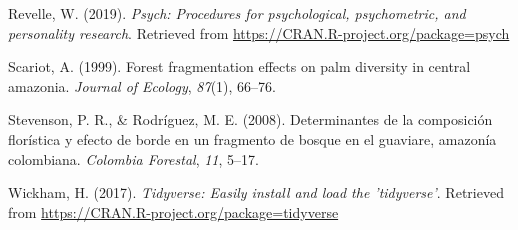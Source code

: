 \documentclass[11pt,]{article}
\begin{document}
\hypertarget{ref-psych}{}
Revelle, W. (2019). \emph{Psych: Procedures for psychological,
psychometric, and personality research}. Retrieved from
\url{https://CRAN.R-project.org/package=psych}

\hypertarget{ref-scariot1999forest}{}
Scariot, A. (1999). Forest fragmentation effects on palm diversity in
central amazonia. \emph{Journal of Ecology}, \emph{87}(1), 66--76.

\hypertarget{ref-stevenson2008determinantes}{}
Stevenson, P. R., \& Rodríguez, M. E. (2008). Determinantes de la
composición florística y efecto de borde en un fragmento de bosque en el
guaviare, amazonía colombiana. \emph{Colombia Forestal}, \emph{11},
5--17.

\hypertarget{ref-Tidyverse}{}
Wickham, H. (2017). \emph{Tidyverse: Easily install and load the
'tidyverse'}. Retrieved from
\url{https://CRAN.R-project.org/package=tidyverse}




\newpage
\singlespacing 
\end{document}
